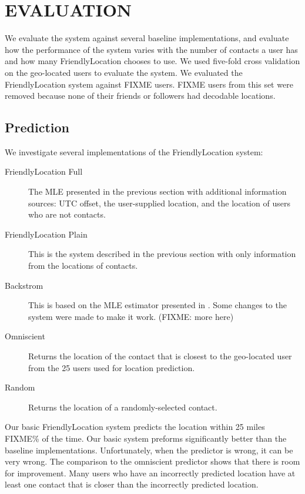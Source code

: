 \chapter{\uppercase{Evaluation}}
We evaluate the system against several baseline implementations, and evaluate
how the performance of the system varies with the number of contacts a user has
and how many FriendlyLocation chooses to use.
We used five-fold cross validation on the geo-located users to evaluate the system.
We evaluated the FriendlyLocation system against FIXME users.
FIXME users from this set were removed because none of their friends or
followers had decodable locations.

\section{Prediction}
We investigate several implementations of the FriendlyLocation system:
\begin{description}
\item[FriendlyLocation Full] The MLE presented in the previous section with
    additional information sources: UTC offset, the user-supplied location,
    and the location of users who are not contacts.
\item[FriendlyLocation Plain] This is the system described in the previous
    section with only information from the locations of contacts.
\item[Backstrom] This is based on the MLE estimator presented in
    \cite{backstro m2010find}. Some changes to the system were made to make it
    work. (FIXME: more here)
\item[Omniscient] Returns the location of the contact that is closest to the
    geo-located user from the 25 users used for location prediction.
\item[Random] Returns the location of a randomly-selected contact.
\end{description}

Our basic FriendlyLocation system predicts the location within 25 miles FIXME\% of
the time.
%
Our basic system preforms significantly better than the baseline implementations.
%
Unfortunately, when the predictor is wrong, it can be very wrong.
%
The comparison to the omniscient predictor shows that there is room for improvement.
%
Many users who have an incorrectly predicted location have at least one contact
that is closer than the incorrectly predicted location.

